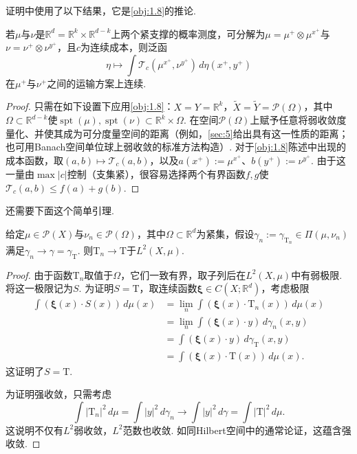 证明中使用了以下结果，它是\autoref{obj:1.8}的推论.

\begin{corollary}\label{obj:2.24}
若$\mu$与$\nu$是$\mathbb R^d=\mathbb R^k\times\mathbb R^{d-k}$上两个紧支撑的概率测度，可分解为$\mu=\mu^+\otimes\mu^{x^+}$与$\nu=\nu^+\otimes\nu^{y^+}$，且$c$为连续成本，则泛函
\[
\eta\longmapsto\int\mathscr T_c(\mu^{x^+},\nu^{y^+})\,d\eta(x^+,y^+)
\]
在$\mu^+$与$\nu^+$之间的运输方案上连续.
\end{corollary}
\begin{proof}
只需在如下设置下应用\autoref{obj:1.8}：$X=Y=\mathbb R^k$，$\widetilde X=\widetilde Y=\mathscr P(\Omega)$，其中$\Omega\subset\mathbb R^{d-k}$使$\operatorname{spt}(\mu),\operatorname{spt}(\nu)\subset\mathbb R^k\times\Omega$. 在空间$\mathscr P(\Omega)$上赋予任意将弱收敛度量化、并使其成为可分度量空间的距离（例如，\autoref{sec:5}给出具有这一性质的距离；也可用Banach空间单位球上弱收敛的标准方法构造）. 对于\autoref{obj:1.8}陈述中出现的成本函数，取$(a,b)\mapsto\mathscr T_c(a,b)$，以及$a(x^+):=\mu^{x^+}$、$b(y^+):=\nu^{y^+}$. 由于这一量由$\max|c|$控制（支集紧），很容易选择两个有界函数$f,g$使$\mathscr T_c(a,b)\le f(a)+g(b)$.
\end{proof}

还需要下面这个简单引理.

\begin{lemma}\label{obj:2.25}
给定$\mu\in\mathscr P(X)$与$\nu_n\in\mathscr P(\Omega)$，其中$\Omega\subset\mathbb R^d$为紧集，假设$\gamma_n:=\gamma_{\mathrm T_n}\in\Pi(\mu,\nu_n)$满足$\gamma_n\to\gamma=\gamma_{\mathrm T}$. 则$\mathrm T_n\to\mathrm T$于$L^2(X,\mu)$.
\end{lemma}
\begin{proof}
由于函数$\mathrm T_n$取值于$\Omega$，它们一致有界，取子列后在$L^2(X,\mu)$中有弱极限. 将这一极限记为$S$. 为证明$S=\mathrm T$，取连续函数$\boldsymbol\xi\in C(X;\mathbb R^d)$，考虑极限
\[
\begin{aligned}
\int(\boldsymbol\xi(x)\cdot S(x))\,d\mu(x)
&=\lim_n\int(\boldsymbol\xi(x)\cdot\mathrm T_n(x))\,d\mu(x)\\
&=\lim_n\int(\boldsymbol\xi(x)\cdot y)\,d\gamma_n(x,y)\\
&=\int(\boldsymbol\xi(x)\cdot y)\,d\gamma_{\mathrm T}(x,y)\\
&=\int(\boldsymbol\xi(x)\cdot\mathrm T(x))\,d\mu(x).
\end{aligned}
\]
这证明了$S=\mathrm T$.

为证明强收敛，只需考虑
\[
\int|\mathrm T_n|^2\,d\mu=\int|y|^2\,d\gamma_n
\longrightarrow\int|y|^2\,d\gamma=\int|\mathrm T|^2\,d\mu.
\]
这说明不仅有$L^2$弱收敛，$L^2$范数也收敛. 如同Hilbert空间中的通常论证，这蕴含强收敛.
\end{proof}

